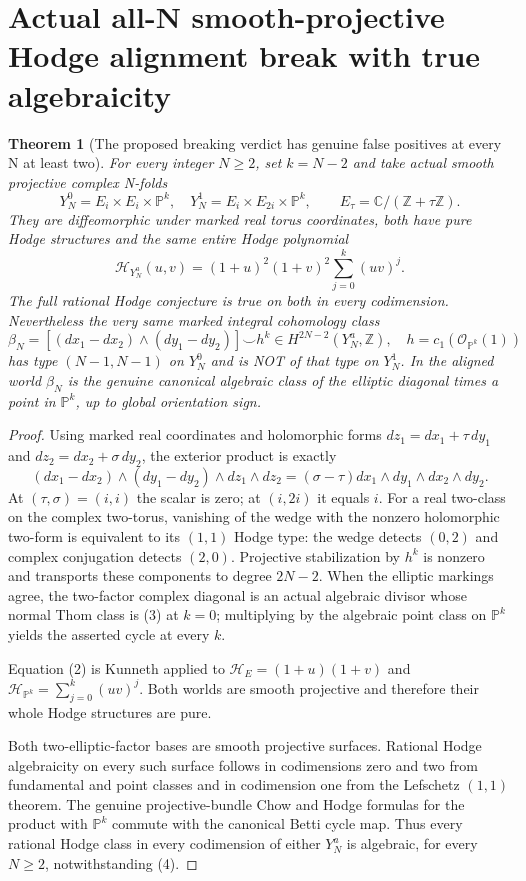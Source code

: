 \documentclass[11pt]{article}
\newtheorem{theorem}{Theorem}
\begin{document}
\section{Actual all-N smooth-projective Hodge alignment break with true algebraicity}
\begin{theorem}[The proposed breaking verdict has genuine false positives at every N at least two]
For every integer $N\ge2$, set $k=N-2$ and take actual smooth projective complex N-folds
\[
 Y_N^0=E_i\times E_i\times\mathbb P^k,\quad
 Y_N^1=E_i\times E_{2i}\times\mathbb P^k,\qquad
 E_\tau=\mathbb C/(\mathbb Z+\tau\mathbb Z).
 \tag{1}
\]
They are diffeomorphic under marked real torus coordinates, both have pure Hodge structures and the same entire Hodge polynomial
\[
 \boxed{\mathcal H_{Y_N^a}(u,v)=(1+u)^2(1+v)^2\sum_{j=0}^k(uv)^j.}\tag{2}
\]
The full rational Hodge conjecture is true on both in every codimension.
Nevertheless the very same marked integral cohomology class
\[
 \boxed{
 \beta_N=[(dx_1-dx_2)\wedge(dy_1-dy_2)]\smile h^k
 \in H^{2N-2}(Y_N^a,\mathbb Z),\quad
 h=c_1(\mathcal O_{\mathbb P^k}(1))
 } \tag{3}
\]
has type $(N-1,N-1)$ on $Y_N^0$ and is NOT of that type on $Y_N^1$.
In the aligned world $\beta_N$ is the genuine canonical algebraic class
of the elliptic diagonal times a point in $\mathbb P^k$,
up to global orientation sign.
\end{theorem}
\begin{proof}
Using marked real coordinates and holomorphic forms
$dz_1=dx_1+\tau\,dy_1$ and $dz_2=dx_2+\sigma\,dy_2$,
the exterior product is exactly
\[
 \boxed{
 (dx_1-dx_2)\wedge(dy_1-dy_2)\wedge dz_1\wedge dz_2
 =(\sigma-\tau)dx_1\wedge dy_1\wedge dx_2\wedge dy_2.
 } \tag{4}
\]
At $(\tau,\sigma)=(i,i)$ the scalar is zero; at $(i,2i)$ it equals $i$.
For a real two-class on the complex two-torus, vanishing of the
wedge with the nonzero holomorphic two-form is equivalent to its
$(1,1)$ Hodge type: the wedge detects $(0,2)$ and complex
conjugation detects $(2,0)$. Projective stabilization by $h^k$
is nonzero and transports these components to degree $2N-2$.
When the elliptic markings agree, the two-factor complex diagonal
is an actual algebraic divisor whose normal Thom class is (3)
at $k=0$; multiplying by the algebraic point class on
$\mathbb P^k$ yields the asserted cycle at every $k$.

Equation (2) is Kunneth applied to
$\mathcal H_E=(1+u)(1+v)$ and
$\mathcal H_{\mathbb P^k}=\sum_{j=0}^k(uv)^j$.
Both worlds are smooth projective and therefore their
whole Hodge structures are pure.

Both two-elliptic-factor bases are smooth projective
surfaces. Rational Hodge algebraicity on every such
surface follows in codimensions zero and two from
fundamental and point classes and in codimension one
from the Lefschetz $(1,1)$ theorem. The genuine
projective-bundle Chow and Hodge formulas for the
product with $\mathbb P^k$ commute with the canonical
Betti cycle map. Thus every rational Hodge class
in every codimension of either $Y_N^a$ is algebraic,
for every $N\ge2$, notwithstanding (4).
\end{proof}
\end{document}

